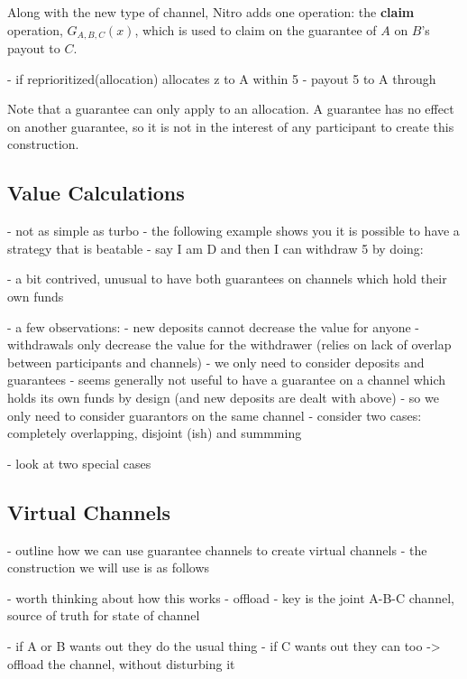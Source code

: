 \documentclass{article}
\begin{document}
Along with the new type of channel, Nitro adds one operation: the \textbf{claim} operation, $G_{A, B, C}(x)$, which is used to claim on the guarantee of $A$ on $B$'s payout to $C$.





- if reprioritized(allocation) allocates z to A within 5
  - payout 5 to A through

Note that a guarantee can only apply to an allocation. A guarantee has no effect on another guarantee, so it is not in the interest of any participant to create this construction.

\subsection{Value Calculations}

- not as simple as turbo
- the following example shows you it is possible to have a strategy that is beatable
- say I am D and then I can withdraw 5 by doing:

- a bit contrived, unusual to have both guarantees on channels which hold their own funds

- a few observations:
  - new deposits cannot decrease the value for anyone
  - withdrawals only decrease the value for the withdrawer (relies on lack of overlap between participants and channels)
  - we only need to consider deposits and guarantees
  - seems generally not useful to have a guarantee on a channel which holds its own funds by design
    (and new deposits are dealt with above)
  - so we only need to consider guarantors on the same channel
  - consider two cases: completely overlapping, disjoint (ish) and summming

  - look at two special cases

\subsection{Virtual Channels}

- outline how we can use guarantee channels to create virtual channels
- the construction we will use is as follows




- worth thinking about how this works
- offload
- key is the joint A-B-C channel, source of truth for state of channel

- if A or B wants out they do the usual thing
- if C wants out they can too -> offload the channel, without disturbing it
\end{document}
